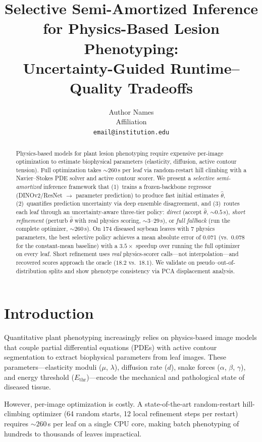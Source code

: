 \documentclass[11pt,a4paper]{article}
\title{Selective Semi-Amortized Inference for Physics-Based Lesion Phenotyping:\\
Uncertainty-Guided Runtime--Quality Tradeoffs}
\author{
  Author Names\\
  Affiliation\\
  \texttt{email@institution.edu}
}
\date{}
\begin{document}
\maketitle

\begin{abstract}
Physics-based models for plant lesion phenotyping require expensive per-image optimization
to estimate biophysical parameters (elasticity, diffusion, active contour tension).
Full optimization takes ${\sim}260$\,s per leaf via random-restart hill climbing with
a Navier--Stokes PDE solver and active contour scorer.
We present a \emph{selective semi-amortized} inference framework that
(1)~trains a frozen-backbone regressor (DINOv2/ResNet $\to$ parameter prediction)
to produce fast initial estimates $\hat{\theta}$,
(2)~quantifies prediction uncertainty via deep ensemble disagreement, and
(3)~routes each leaf through an uncertainty-aware three-tier policy:
\emph{direct} (accept $\hat{\theta}$, ${\sim}0.5$\,s),
\emph{short refinement} (perturb $\hat{\theta}$ with real physics scoring, ${\sim}3$--$29$\,s), or
\emph{full fallback} (run the complete optimizer, ${\sim}260$\,s).
On 174 diseased soybean leaves with 7 physics parameters,
the best selective policy achieves a mean absolute error of 0.071
(vs.\ 0.078 for the constant-mean baseline) with a $3.5\times$ speedup over
running the full optimizer on every leaf.
Short refinement uses \emph{real} physics-scorer calls---not interpolation---and
recovered scores approach the oracle ($18.2$ vs.\ $18.1$).
We validate on pseudo--out-of-distribution splits and show phenotype consistency
via PCA displacement analysis.
\end{abstract}

\section{Introduction}
\label{sec:intro}

Quantitative plant phenotyping increasingly relies on physics-based image models
that couple partial differential equations (PDEs) with active contour segmentation
to extract biophysical parameters from leaf images.
These parameters---elasticity moduli ($\mu$, $\lambda$), diffusion rate ($d$),
snake forces ($\alpha$, $\beta$, $\gamma$), and energy threshold ($E_\text{thr}$)---encode
the mechanical and pathological state of diseased tissue.

However, per-image optimization is costly.
A state-of-the-art random-restart hill-climbing optimizer
(64 random starts, 12 local refinement steps per restart) requires
${\sim}260$\,s per leaf on a single CPU core, making batch phenotyping of
hundreds to thousands of leaves impractical.
\end{document}
